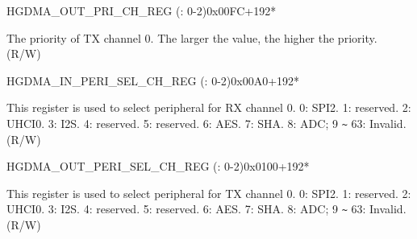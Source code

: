 \begin{register}{H}{GDMA\_OUT\_PRI\_CH\_REG (: 0-2)}{0x00FC+192*}\label{regdesc:GDMAOUTPRICHNREG}
%
%
\regnewline%
\begin{regdesc}\begin{reglist}
\label{fielddesc:GDMATXPRICHN}\item [GDMA\_TX\_PRI\_CH\regindex{n}] The priority of TX channel 0. The larger the value, the higher the priority. (R/W)
\end{reglist}\end{regdesc}
\end{register}


\begin{register}{H}{GDMA\_IN\_PERI\_SEL\_CH\_REG (: 0-2)}{0x00A0+192*}\label{regdesc:GDMAINPERISELCHNREG}
%
%
\regnewline%
\begin{regdesc}\begin{reglist}
\label{fielddesc:GDMAPERIINSELCHN}\item [GDMA\_PERI\_IN\_SEL\_CH\regindex{n}] This register is used to select peripheral for RX channel 0. 0: SPI2. 1: reserved. 2: UHCI0. 3: I2S. 4: reserved. 5: reserved. 6: AES. 7: SHA. 8: ADC; 9 \verb+~+ 63: Invalid. (R/W)
\end{reglist}\end{regdesc}
\end{register}


\begin{register}{H}{GDMA\_OUT\_PERI\_SEL\_CH\_REG (: 0-2)}{0x0100+192*}\label{regdesc:GDMAOUTPERISELCHNREG}
%
%
\regnewline%
\begin{regdesc}\begin{reglist}
\label{fielddesc:GDMAPERIOUTSELCHN}\item [GDMA\_PERI\_OUT\_SEL\_CH\regindex{n}] This register is used to select peripheral for TX channel 0. 0: SPI2. 1: reserved. 2: UHCI0. 3: I2S. 4: reserved. 5: reserved. 6: AES. 7: SHA. 8: ADC; 9 \verb+~+ 63: Invalid. (R/W)
\end{reglist}\end{regdesc}
\end{register}
